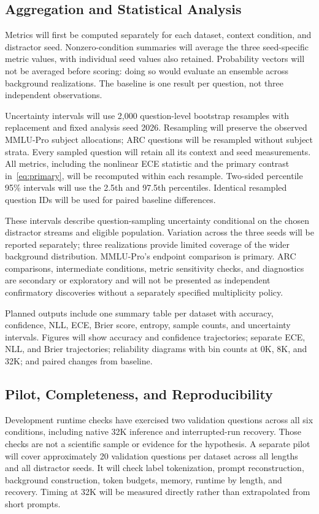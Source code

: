 \documentclass[conference]{IEEEtran}
\begin{document}
\subsection{Aggregation and Statistical Analysis}
Metrics will first be computed separately for each dataset, context condition, and distractor seed. Nonzero-condition summaries will average the three seed-specific metric values, with individual seed values also retained. Probability vectors will not be averaged before scoring: doing so would evaluate an ensemble across background realizations. The baseline is one result per question, not three independent observations.

Uncertainty intervals will use 2,000 question-level bootstrap resamples with replacement and fixed analysis seed 2026. Resampling will preserve the observed MMLU-Pro subject allocations; ARC questions will be resampled without subject strata. Every sampled question will retain all its context and seed measurements. All metrics, including the nonlinear ECE statistic and the primary contrast in~\eqref{eq:primary}, will be recomputed within each resample. Two-sided percentile 95\% intervals will use the 2.5th and 97.5th percentiles. Identical resampled question IDs will be used for paired baseline differences.

These intervals describe question-sampling uncertainty conditional on the chosen distractor streams and eligible population. Variation across the three seeds will be reported separately; three realizations provide limited coverage of the wider background distribution. MMLU-Pro's endpoint comparison is primary. ARC comparisons, intermediate conditions, metric sensitivity checks, and diagnostics are secondary or exploratory and will not be presented as independent confirmatory discoveries without a separately specified multiplicity policy.

Planned outputs include one summary table per dataset with accuracy, confidence, NLL, ECE, Brier score, entropy, sample counts, and uncertainty intervals. Figures will show accuracy and confidence trajectories; separate ECE, NLL, and Brier trajectories; reliability diagrams with bin counts at 0K, 8K, and 32K; and paired changes from baseline.

\subsection{Pilot, Completeness, and Reproducibility}
Development runtime checks have exercised two validation questions across all six conditions, including native 32K inference and interrupted-run recovery. Those checks are not a scientific sample or evidence for the hypothesis. A separate pilot will cover approximately 20 validation questions per dataset across all lengths and all distractor seeds. It will check label tokenization, prompt reconstruction, background construction, token budgets, memory, runtime by length, and recovery. Timing at 32K will be measured directly rather than extrapolated from short prompts.
\end{document}
